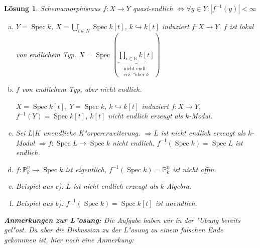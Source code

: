 \documentclass[paper = A4, fontsize=12pt, numbers=noendperiod, chapterprefix=true]{scrbook}
\theoremstyle{break}
\newtheorem{Loes}{L\"osung}
\theoremstyle{nonumberbreak}
\theoremstyle{nonumberplain}
\DeclareMathOperator{\Spec}{Spec}
\newcommand{\N}{\mathbb{N}}
\newcommand{\IP}{\mathbb{P}}%
\begin{document}
\begin{Loes}
Schemamorphismus $f: X \to Y$ quasi-endlich $\Leftrightarrow \forall y \in Y: |f^{-1}(y)| < \infty$

\begin{center}\end{center}
\begin{enumerate}[a)]
\item
	$Y = \Spec k$, $X = \bigcup\limits_{i \in N}^\cdot \Spec k[t]$, $k \hookrightarrow k[t]$ induziert $f: X \to Y$. $f$ ist lokal von endlichem Typ. $X = \Spec (\underbrace{\prod\limits_{i \in \N} k[t]}_{\substack{\text{nicht endl.}\\\text{erz. "uber }k}})$
\item
	$f$ von endlichem Typ, aber nicht endlich.
	
	$X = \Spec k[t]$, $Y = \Spec k$, $k \hookrightarrow k[t]$ induziert $f: X \to Y$, $f^{-1}(Y) = \Spec k[t]$, $k[t]$ nicht endlich erzeugt als $k$-Modul.
\item
	Sei $L|K$ unendliche K"orpererweiterung.	$\Rightarrow L$ ist nicht endlich erzeugt als $k$-Modul $\Rightarrow f: \Spec L \to \Spec k$ nicht endlich. $f^{-1}(\Spec k) = \Spec L$ ist endlich.
\item
	$f: \IP_k^n \to \Spec k$ ist eigentlich, $f^{-1}(\Spec k) = \IP_k^n$ ist nicht affin.
\item
	Beispiel aus c): $L$ ist nicht endlich erzeugt als $k$-Algebra.
\item
	Beispiel aus b): $f^{-1}(\Spec k) = \Spec k[t]$ ist unendlich.
\end{enumerate}
\textbf{Anmerkungen zur L"osung:}
Die Aufgabe haben wir in der "Ubung bereits gel"ost. Da aber die Diskussion zu der L"osung zu einem falschen Ende gekommen ist, hier noch eine Anmerkung:


\end{Loes}
\end{document}
